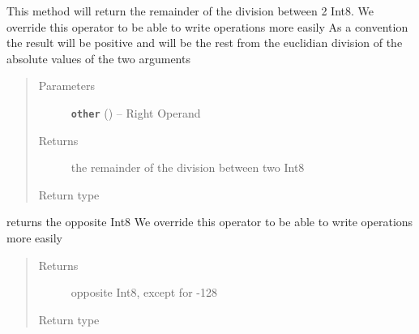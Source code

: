 \documentclass[letterpaper,10pt,english]{sphinxmanual}
\begin{document}
\begin{fulllineitems}

\begin{fulllineitems}
\label{datatypes.integers:datatypes.integers.Int8.Int8.__mod__}
This method will return the remainder of the division between 2 Int8.
We override this operator to be able to write operations more easily
As a convention the result will be positive and will be the rest from the euclidian division of the absolute values of the two arguments
\begin{quote}\begin{description}
\item[{Parameters}] \leavevmode
\textbf{\texttt{other}} ({\hyperref[datatypes.integers:datatypes.integers.Int8.Int8]{}}) -- Right Operand

\item[{Returns}] \leavevmode
the remainder of the division between two Int8

\item[{Return type}] \leavevmode
{\hyperref[datatypes.integers:datatypes.integers.Int8.Int8]{}}

\end{description}\end{quote}

\end{fulllineitems}


\begin{fulllineitems}
\label{datatypes.integers:datatypes.integers.Int8.Int8.__neg__}
returns the opposite Int8
We override this operator to be able to write operations more easily
\begin{quote}\begin{description}
\item[{Returns}] \leavevmode
opposite Int8, except for -128

\item[{Return type}] \leavevmode
{\hyperref[datatypes.integers:datatypes.integers.Int8.Int8]{}}

\end{description}\end{quote}

\end{fulllineitems}


\end{fulllineitems}
\end{document}

